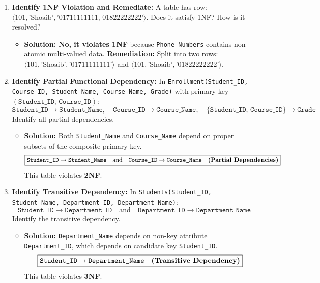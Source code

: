 \begin{enumerate}[label=\textbf{Problem \arabic*.,resume},leftmargin=1.5cm]
\item \textbf{Identify 1NF Violation and Remediate:}
A table has row: $\langle 101, \text{'Shoaib'}, \text{'01711111111, 01822222222'} \rangle$. Does it satisfy 1NF? How is it resolved?
\begin{itemize}
\item \textbf{Solution:}
\textbf{No, it violates 1NF} because \texttt{Phone\_Numbers} contains non-atomic multi-valued data.
\textbf{Remediation:} Split into two rows: $\langle 101, \text{'Shoaib'}, \text{'01711111111'} \rangle$ and $\langle 101, \text{'Shoaib'}, \text{'01822222222'} \rangle$.
\end{itemize}

\item \textbf{Identify Partial Functional Dependency:}
In \texttt{Enrollment(Student\_ID, Course\_ID, Student\_Name, Course\_Name, Grade)} with primary key $(\texttt{Student\_ID, Course\_ID})$:
\[ \texttt{Student\_ID} \rightarrow \texttt{Student\_Name}, \quad \texttt{Course\_ID} \rightarrow \texttt{Course\_Name}, \quad \{\texttt{Student\_ID, Course\_ID}\} \rightarrow \texttt{Grade} \]
Identify all partial dependencies.
\begin{itemize}
\item \textbf{Solution:}
Both \texttt{Student\_Name} and \texttt{Course\_Name} depend on proper subsets of the composite primary key.
\[ \boxed{\texttt{Student\_ID} \rightarrow \texttt{Student\_Name} \quad \text{and} \quad \texttt{Course\_ID} \rightarrow \texttt{Course\_Name} \quad \text{\textbf{(Partial Dependencies)}}} \]
This table violates \textbf{2NF}.
\end{itemize}

\item \textbf{Identify Transitive Dependency:}
In \texttt{Students(Student\_ID, Student\_Name, Department\_ID, Department\_Name)}:
\[ \texttt{Student\_ID} \rightarrow \texttt{Department\_ID} \quad \text{and} \quad \texttt{Department\_ID} \rightarrow \texttt{Department\_Name} \]
Identify the transitive dependency.
\begin{itemize}
\item \textbf{Solution:}
\texttt{Department\_Name} depends on non-key attribute \texttt{Department\_ID}, which depends on candidate key \texttt{Student\_ID}.
\[ \boxed{\texttt{Student\_ID} \rightarrow \texttt{Department\_Name} \quad \text{\textbf{(Transitive Dependency)}}} \]
This table violates \textbf{3NF}.
\end{itemize}


\end{enumerate}
